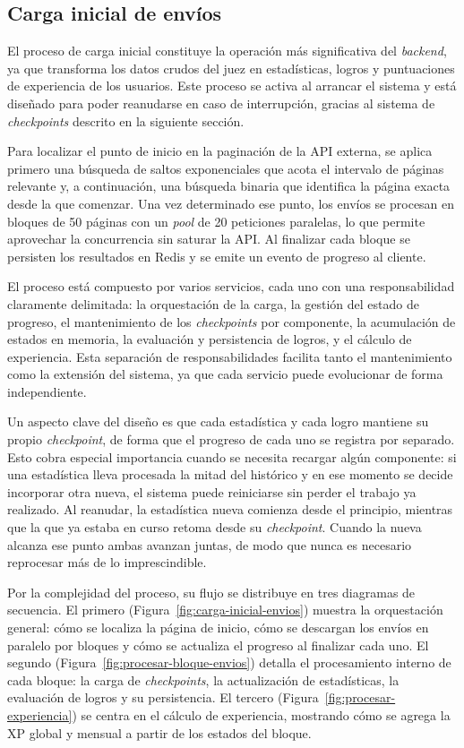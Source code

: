 \subsection{Carga inicial de envíos}

El proceso de carga inicial constituye la operación más significativa del \textit{backend}, ya que transforma los datos crudos del juez en estadísticas, logros y puntuaciones de experiencia de los usuarios. Este proceso se activa al arrancar el sistema y está diseñado para poder reanudarse en caso de interrupción, gracias al sistema de \textit{checkpoints} descrito en la siguiente sección.

Para localizar el punto de inicio en la paginación de la API externa, se aplica primero una búsqueda de saltos exponenciales que acota el intervalo de páginas relevante y, a continuación, una búsqueda binaria que identifica la página exacta desde la que comenzar. Una vez determinado ese punto, los envíos se procesan en bloques de 50 páginas con un \textit{pool} de 20 peticiones paralelas, lo que permite aprovechar la concurrencia sin saturar la API. Al finalizar cada bloque se persisten los resultados en Redis y se emite un evento de progreso al cliente.

El proceso está compuesto por varios servicios, cada uno con una responsabilidad claramente delimitada: la orquestación de la carga, la gestión del estado de progreso, el mantenimiento de los \textit{checkpoints} por componente, la acumulación de estados en memoria, la evaluación y persistencia de logros, y el cálculo de experiencia. Esta separación de responsabilidades facilita tanto el mantenimiento como la extensión del sistema, ya que cada servicio puede evolucionar de forma independiente.

Un aspecto clave del diseño es que cada estadística y cada logro mantiene su propio \textit{checkpoint}, de forma que el progreso de cada uno se registra por separado. Esto cobra especial importancia cuando se necesita recargar algún componente: si una estadística lleva procesada la mitad del histórico y en ese momento se decide incorporar otra nueva, el sistema puede reiniciarse sin perder el trabajo ya realizado. Al reanudar, la estadística nueva comienza desde el principio, mientras que la que ya estaba en curso retoma desde su \textit{checkpoint}. Cuando la nueva alcanza ese punto ambas avanzan juntas, de modo que nunca es necesario reprocesar más de lo imprescindible.

Por la complejidad del proceso, su flujo se distribuye en tres diagramas de secuencia. El primero (Figura~\ref{fig:carga-inicial-envios}) muestra la orquestación general: cómo se localiza la página de inicio, cómo se descargan los envíos en paralelo por bloques y cómo se actualiza el progreso al finalizar cada uno. El segundo (Figura~\ref{fig:procesar-bloque-envios}) detalla el procesamiento interno de cada bloque: la carga de \textit{checkpoints}, la actualización de estadísticas, la evaluación de logros y su persistencia. El tercero (Figura~\ref{fig:procesar-experiencia}) se centra en el cálculo de experiencia, mostrando cómo se agrega la XP global y mensual a partir de los estados del bloque.

